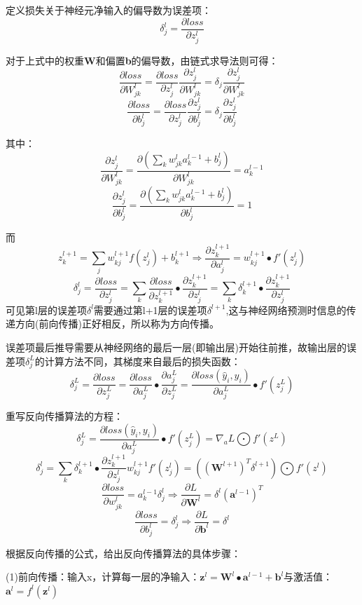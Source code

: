 \documentclass[openbib]{article}
\begin{document}
定义损失关于神经元净输入的偏导数为误差项：$$\delta_j^l=\frac{\partial loss}{\partial z_j^l}$$

对于上式中的权重\textbf{W}和偏置\textbf{b}的偏导数，由链式求导法则可得：
$$\frac{\partial loss}{\partial W_{jk}^l}=\frac{\partial loss}{\partial z_j^l}\frac{\partial z_j^l}{\partial W_{jk}^l}=\delta_j\frac{\partial z_j^l}{\partial W_{jk}^l}$$
$$\frac{\partial loss}{\partial b_j^l}=\frac{\partial loss}{\partial z_j^l}\frac{\partial z_j^l}{\partial b_j^l}=\delta_j\frac{\partial z_j^l}{\partial b_j^l}$$

其中：
$$\frac{\partial z_j^l}{\partial W_{jk}^l}=\frac{\partial (\sum_{k}w_{jk}^la_k^{l-1}+b_j^l)}{\partial W_{jk}^l}=a_k^{l-1}$$
$$\frac{\partial z_j^l}{\partial b_j^l}=\frac{\partial (\sum_{k}w_{jk}^la_k^{l-1}+b_j^l)}{\partial b_j^l}=1$$

而
$$z_k^{l+1}=\sum_jw_{kj}^{l+1}f(z_j^l)+b_k^{l+1}\Rightarrow \frac{\partial z_k^{l+1}}{\partial a_j^l}=w_{kj}^{l+1}\bullet f'(z_j^l)$$
$$\delta_j^l=\frac{\partial loss}{\partial z_j^l}=\sum_{k}\frac{\partial loss}{\partial z_k^{l+1}}\bullet \frac{\partial z_k^{l+1}}{\partial z_j^l}=\sum_k\delta_k^{l+1}\bullet \frac{\partial z_k^{l+1}}{\partial z_j^l}$$
可见第l层的误差项$\delta^l$需要通过第l+1层的误差项$\delta^{l+1}$,这与神经网络预测时信息的传递方向(前向传播)正好相反，所以称为方向传播。

误差项最后推导需要从神经网络的最后一层(即输出层)开始往前推，故输出层的误差项$\delta_j^L$的计算方法不同，其梯度来自最后的损失函数：
$$\delta_j^L= \frac{\partial loss}{\partial z_j^L}=\frac{\partial loss}{\partial a_j^L}\bullet \frac{\partial a_j^L}{\partial z_j^L}=\frac{\partial loss(\hat{y}_i,y_i)}{\partial a_j^L}\bullet f'(z_j^L)$$

重写反向传播算法的方程：
$$\delta_j^L=\frac{\partial loss(\hat{y}_i,y_i)}{\partial a_j^L}\bullet f'(z_j^L)=\nabla_aL\bigodot f'(z^L)$$
$$\delta_j^l=\sum_{k}\delta_k^{l+1}\bullet \frac{\partial z_k^{l+1}}{\partial z_j^l}w_{kj}^{l+1}f'(z_j^l)=((\textbf{W}^{l+1})^T\delta^{l+1})\bigodot f'(z^l)$$
$$\frac{\partial loss}{\partial w_{jk}^l}=a_k^{l-1}\delta_j^l\Rightarrow \frac{\partial L}{\partial \textbf{W}^l}=\delta^l(\textbf{a}^{l-1})^T$$
$$\frac{\partial loss}{\partial b_j^l}=\delta_j^l\Rightarrow \frac{\partial L}{\partial \textbf{b}^l}=\delta^l$$

根据反向传播的公式，给出反向传播算法的具体步骤：

(1)前向传播：输入x，计算每一层的净输入：$\textbf{z}^l=\textbf{W}^l\bullet \textbf{a}^{l-1}+\textbf{b}^l$与激活值：$\textbf{a}^l=f^l(\textbf{z}^l)$
\end{document}
